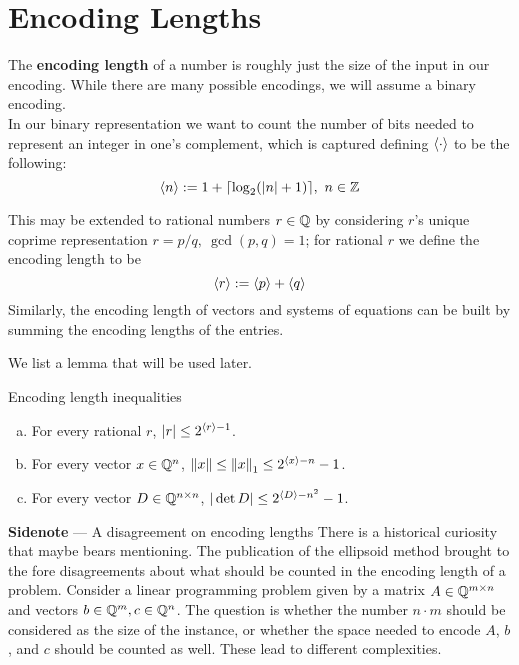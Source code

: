
\section{Encoding Lengths}

The \textbf{encoding length} of a number is roughly just the size of the input
in our encoding. While there are many possible encodings, we will assume a
binary encoding. \\

In our binary representation we want to count the number of bits needed to
represent an integer in one's complement, which is captured defining \(\langle {\cdot} \rangle\) to be the following:
\begin{equation} \label{eq:encode-length-int}
  \langle {n} \rangle := 1 + \lceil \log_2(|n| + 1)\rceil,\ n \in \mathbb Z
\end{equation}

This may be extended to rational numbers \(r \in \mathbb Q\) by considering \(r\)'s
unique coprime representation \(r = p/q,\ \gcd(p, q) = 1\); for rational \(r\)
we define the encoding length to be
%
\begin{equation} \label{eq:encode-length-rational}
\langle {r} \rangle := \langle {p} \rangle + \langle {q} \rangle
\end{equation}
Similarly, the encoding length of vectors and systems of equations can be built
by summing the encoding lengths of the entries.

We list a lemma that will be used later.
\begin{lemma}{Encoding length inequalities}
  \begin{enumerate}[(a)]
    \item For every rational \(r\), \(|r| \leq 2^{\langle {r} \rangle - 1}\).
    \item For every vector \(x \in \mathbb Q^n\), \(\left\lVert x\right\rVert \leq \left\lVert x\right\rVert_1 \leq 2^{\langle {x} \rangle - n} - 1\).
    \item For every vector \(D \in \mathbb Q^{n\times n}\), \(|\det D| \leq 2^{\langle {D} \rangle - n^2} - 1\).
  \end{enumerate}
\end{lemma}

\begin{sidenotebox}{\textbf{Sidenote} --- A disagreement on encoding lengths}
There is a historical curiosity that maybe bears mentioning. The
publication of the ellipsoid method brought to the fore disagreements about what
should be counted in the encoding length of a problem. Consider a linear
programming problem given by a matrix \(A \in \mathbb Q^{m \times n}\) and vectors \(b
\in \mathbb Q^m, c \in \mathbb Q^n\). The question is whether the number \(n \cdot m\) should
be considered as the size of the instance, or whether the space needed to encode
\(A\), \(b\), and \(c\) should be counted as well. These lead to different
complexities.
\end{sidenotebox}
